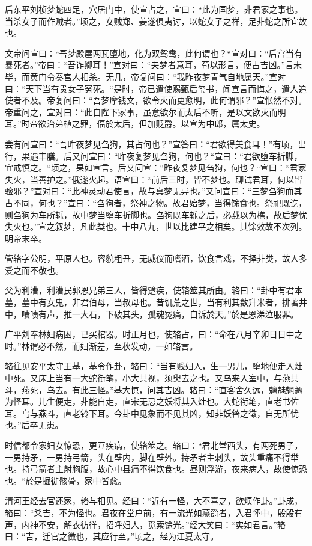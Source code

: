 \documentclass[12pt,UTF8]{ctexbook}
\begin{document}
后东平刘桢梦蛇四足，穴居门中，使宣占之，宣曰：“此为国梦，非君家之事也。当杀女子而作贼者。”顷之，女贼郑、姜遂俱夷讨，以蛇女子之祥，足非蛇之所宜故也。

文帝问宣曰：“吾梦殿屋两瓦堕地，化为双鸳鸯，此何谓也？“宣对曰：“后宫当有暴死者。”帝曰：“吾诈卿耳！”宣对曰：“夫梦者意耳，苟以形言，便占吉凶。”言未毕，而黄门令奏宫人相杀。无几，帝复问曰：“我昨夜梦青气自地属天。”宣对曰：“天下当有贵女子冤死。“是时，帝已遣使赐甄后玺书，闻宣言而悔之，遣人追使者不及。帝复问曰：“吾梦摩钱文，欲令灭而更愈明，此何谓邪？”宣怅然不对。帝重问之，宣对曰：“此自陛下家事，虽意欲尔而太后不听，是以文欲灭而明耳。”时帝欲治弟植之罪，偪於太后，但加贬爵。以宣为中郎，属太史。

尝有问宣曰：“吾昨夜梦见刍狗，其占何也？”宣答曰：“君欲得美食耳！”有顷，出行，果遇丰膳。后又问宣曰：“昨夜复梦见刍狗，何也？“宣曰：“君欲堕车折脚，宜戒慎之。“顷之，果如宣言。后又问宣：“昨夜复梦见刍狗，何也？“宣曰：“君家失火，当善护之。”俄遂火起。语宣曰：“前后三时，皆不梦也。聊试君耳，何以皆验邪？”宣对曰：“此神灵动君使言，故与真梦无异也。”又问宣曰：“三梦刍狗而其占不同，何也？”宣曰：“刍狗者，祭神之物。故君始梦，当得馀食也。祭祀既讫，则刍狗为车所轹，故中梦当堕车折脚也。刍狗既车轹之后，必载以为樵，故后梦忧失火也。”宣之叙梦，凡此类也。十中八九，世以比建平之相矣。其馀效故不次列。明帝末卒。

管辂字公明，平原人也。容貌粗丑，无威仪而嗜酒，饮食言戏，不择非类，故人多爱之而不敬也。

父为利漕，利漕民郭恩兄弟三人，皆得躄疾，使辂筮其所由。辂曰：“卦中有君本墓，墓中有女鬼，非君伯母，当叔母也。昔饥荒之世，当有利其数升米者，排著井中，啧啧有声，推一大石，下破其头，孤魂冤痛，自诉於天。”於是恩涕泣服罪。

广平刘奉林妇病困，已买棺器。时正月也，使辂占，曰：“命在八月辛卯日日中之时。”林谓必不然，而妇渐差，至秋发动，一如辂言。

辂往见安平太守王基，基令作卦，辂曰：“当有贱妇人，生一男儿，堕地便走入灶中死。又床上当有一大蛇衔笔，小大共视，须臾去之也。又乌来入室中，与燕共斗，燕死，乌去。有此三怪。”基大惊，问其吉凶。辂曰：“直客舍久远，魑魅魍魉为怪耳。儿生便走，非能自走，直宋无忌之妖将其入灶也。大蛇衔笔，直老书佐耳。乌与燕斗，直老铃下耳。今卦中见象而不见其凶，知非妖咎之徵，自无所忧也。”后卒无患。

时信都令家妇女惊恐，更互疾病，使辂筮之。辂曰：“君北堂西头，有两死男子，一男持矛，一男持弓箭，头在壁内，脚在壁外。持矛者主刺头，故头重痛不得举也。持弓箭者主射胸腹，故心中县痛不得饮食也。昼则浮游，夜来病人，故使惊恐也。“於是掘徙骸骨，家中皆愈。

清河王经去官还家，辂与相见。经曰：“近有一怪，大不喜之，欲烦作卦。”卦成，辂曰：“爻吉，不为怪也。君夜在堂户前，有一流光如燕爵者，入君怀中，殷殷有声，内神不安，解衣彷徉，招呼妇人，觅索馀光。”经大笑曰：“实如君言。”辂曰：“吉，迁官之徵也，其应行至。”顷之，经为江夏太守。
\end{document}
